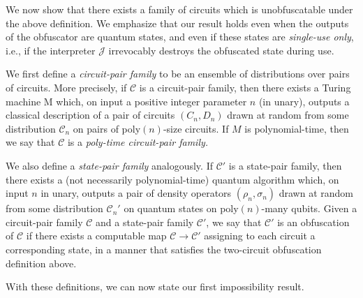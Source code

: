 \documentclass[11pt]{article}
\numberwithin{equation}{section}
\begin{document}
{We now show that there exists a family of circuits which is unobfuscatable under the above definition. We emphasize that our result holds even when the outputs of the obfuscator are quantum states, and even if these states are \emph{single-use only}, i.e., if the interpreter $\mathcal J$ irrevocably destroys the obfuscated state during use. 

We first define a \emph{circuit-pair family} to be an ensemble of distributions over pairs of circuits. More precisely, if $\mathcal C$ is a circuit-pair family, then there exists a Turing machine M which, on input a positive integer parameter $n$ (in unary), outputs a classical description of a pair of circuits $(C_n, D_n)$ drawn at random from some distribution $\mathcal C_n$ on pairs of poly$(n)$-size circuits. If $M$ is polynomial-time, then we say that $\mathcal C$ is a \emph{poly-time circuit-pair family.}

We also define a \emph{state-pair family} analogously. If $\mathcal C'$ is a state-pair family, then there exists a (not necessarily polynomial-time) quantum algorithm which, on input $n$ in unary, outputs a pair of density operators $(\rho_n, \sigma_n)$ drawn at random from some distribution $\mathcal C_n'$ on quantum states on poly$(n)$-many qubits. Given a circuit-pair family $\mathcal C$ and a state-pair family $\mathcal C'$, we say that $\mathcal C'$ is an obfuscation of $\mathcal C$ if there exists a computable map $\mathcal C \rightarrow \mathcal C'$ assigning to each circuit a corresponding state, in a manner that satisfies the two-circuit obfuscation definition above.

With these definitions, we can now state our first impossibility result.

}
\end{document}
